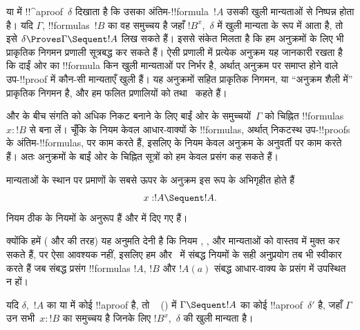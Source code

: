 \documentclass[../../../include/open-logic-section]{subfiles}
\begin{document}


 या  में !!^a{proof}~$\delta$ दिखाता है कि उसका
अंतिम-!!{formula}~$!A$ उसकी खुली मान्यताओं से निष्पन्न होता है। यदि $\Gamma$,
!!{formula}s~$!B$ का वह समुच्चय है जहाँ $!B^x$,~$\delta$ में खुली मान्यता
के रूप में आता है, तो इसे $\delta \Proves \Gamma \Sequent !A$ लिख सकते हैं।
इससे संकेत मिलता है कि हम अनुक्रमों के लिए भी प्राकृतिक निगमन प्रणाली
सूत्रबद्ध कर सकते हैं। ऐसी प्रणाली में प्रत्येक अनुक्रम यह जानकारी रखता है
कि दाईं ओर का !!{formula} किन खुली मान्यताओं पर निर्भर है, अर्थात् अनुक्रम पर
समाप्त होने वाले उप-!!{proof} में कौन-सी मान्यताएँ खुली हैं। यह अनुक्रमों
सहित प्राकृतिक निगमन, या ``अनुक्रम शैली में'' प्राकृतिक निगमन है, और हम
फलित प्रणालियों को  तथा~ कहते हैं।

 और  के बीच संगति को अधिक निकट बनाने के लिए बाईं ओर के
समुच्चयों~$\Gamma$ को चिह्नित !!{formula}s~$x:!B$ से बना लें। चूँकि 
के नियम केवल आधार-वाक्यों के !!{formula}s, अर्थात् निकटस्थ उप-!!{proof}s के
अंतिम-!!{formula}s, पर काम करते हैं, इसलिए  के नियम केवल अनुक्रम के
अनुवर्ती पर काम करते हैं। अतः अनुक्रमों के बाईं ओर के चिह्नित सूत्रों को हम
केवल प्रसंग कह सकते हैं।

मान्यताओं के स्थान पर  प्रमाणों के सबसे ऊपर के अनुक्रम इस रूप के
अभिगृहीत होते हैं
\[x:!A \Sequent !A.\]
नियम ठीक  के नियमों के अनुरूप हैं और  में दिए गए हैं।



क्योंकि हमें ( और  की तरह) यह अनुमति देनी है कि नियम
\Intro{\lif}, \Intro{\lnot}, \Elim{\lor} और \Elim{\lexists} मान्यताओं को
वास्तव में मुक्त कर सकते हैं, पर ऐसा आवश्यक नहीं, इसलिए हम 
और~ में संबद्ध नियमों के सही अनुप्रयोग तब भी स्वीकार करते हैं जब
संबद्ध प्रसंग !!{formula}s $!A$, $!B$ और $!A(a)$ संबद्ध आधार-वाक्य के प्रसंग
में उपस्थित न हों।

\begin{prop}
यदि $\delta$,~$!A$ का  या  में कोई !!a{proof} है, तो
~ () में $\Gamma \Sequent !A$ का कोई !!a{proof}~$\delta'$
है, जहाँ $\Gamma$ उन सभी~$x:!B$ का समुच्चय है जिनके लिए $!B^x$,~$\delta$ की
खुली मान्यता है।
\end{prop}
\end{document}
